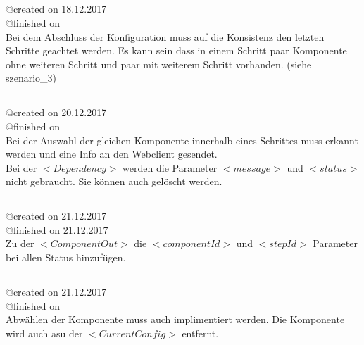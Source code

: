 \documentclass{article}
\begin{document}
\subsection{}
@created on 18.12.2017\\
@finished on \\

Bei dem Abschluss der Konfiguration muss auf die Konsistenz den letzten
Schritte geachtet werden. Es kann sein dass in einem Schritt paar Komponente
ohne weiteren Schritt und paar mit weiterem Schritt vorhanden. (siehe
szenario\_3)\\

\subsection{}
@created on 20.12.2017\\
@finished on \\

Bei der Auswahl der gleichen Komponente innerhalb eines Schrittes muss erkannt
werden und eine Info an den Webclient gesendet.\\

Bei der $<Dependency>$ werden die Parameter $<message>$ und $<status>$ nicht
gebraucht. Sie k\"onnen auch gel\"oscht werden.\\

\subsection{}
@created on 21.12.2017\\
@finished on 21.12.2017\\

Zu der $<ComponentOut>$ die $<componentId>$ und $<stepId>$ Parameter bei
allen Status hinzuf\"ugen.\\

\subsection{}
@created on 21.12.2017\\
@finished on \\

Abw\"ahlen der Komponente muss auch implimentiert werden. Die Komponente wird
auch asu der $<CurrentConfig>$ entfernt.
\end{document}
